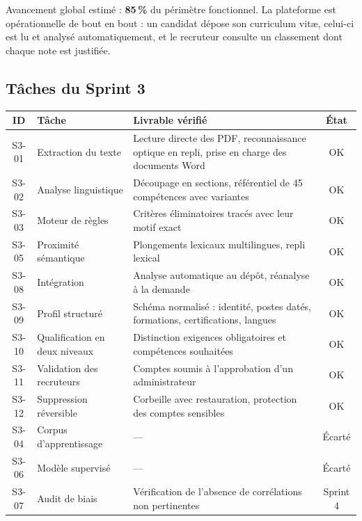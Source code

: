 \documentclass[11pt,a4paper]{article}
\begin{document}
\vspace{2mm}
\noindent Avancement global estimé : \textbf{85\,\%} du périmètre fonctionnel. La plateforme est opérationnelle de bout en bout : un candidat dépose son curriculum vitæ, celui-ci est lu et analysé automatiquement, et le recruteur consulte un classement dont chaque note est justifiée.

\subsection{Tâches du Sprint 3}

\begin{center}
\small
\begin{tabular}{clp{6.6cm}c}
  \toprule
  \textbf{ID} & \textbf{Tâche} & \textbf{Livrable vérifié} & \textbf{État} \\
  \midrule
  S3-01 & Extraction du texte & Lecture directe des PDF, reconnaissance optique en repli, prise en charge des documents Word & \textcolor{vert}{OK} \\
  S3-02 & Analyse linguistique & Découpage en sections, référentiel de 45 compétences avec variantes & \textcolor{vert}{OK} \\
  S3-03 & Moteur de règles & Critères éliminatoires tracés avec leur motif exact & \textcolor{vert}{OK} \\
  S3-05 & Proximité sémantique & Plongements lexicaux multilingues, repli lexical & \textcolor{vert}{OK} \\
  S3-08 & Intégration & Analyse automatique au dépôt, réanalyse à la demande & \textcolor{vert}{OK} \\
  \midrule
  S3-09 & Profil structuré & Schéma normalisé : identité, postes datés, formations, certifications, langues & \textcolor{vert}{OK} \\
  S3-10 & Qualification en deux niveaux & Distinction exigences obligatoires et compétences souhaitées & \textcolor{vert}{OK} \\
  S3-11 & Validation des recruteurs & Comptes soumis à l'approbation d'un administrateur & \textcolor{vert}{OK} \\
  S3-12 & Suppression réversible & Corbeille avec restauration, protection des comptes sensibles & \textcolor{vert}{OK} \\
  \midrule
  S3-04 & Corpus d'apprentissage & — & \textcolor{gris}{Écarté} \\
  S3-06 & Modèle supervisé & — & \textcolor{gris}{Écarté} \\
  S3-07 & Audit de biais & Vérification de l'absence de corrélations non pertinentes & \textcolor{accent}{Sprint 4} \\
  \bottomrule
\end{tabular}
\end{center}
\end{document}
